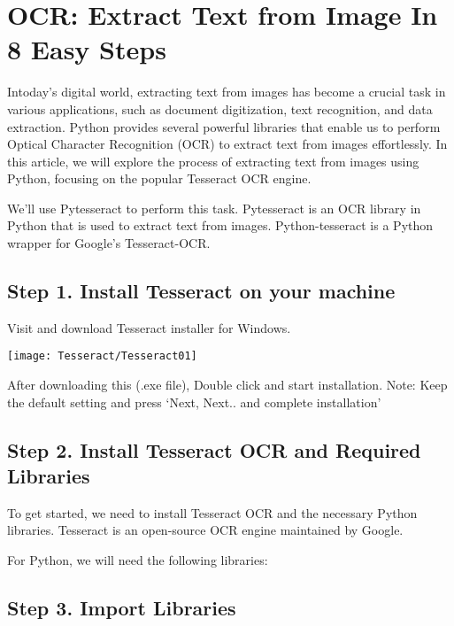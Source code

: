 
\chapter{OCR: Extract Text from Image In 8 Easy Steps}

Intoday’s digital world, extracting text from images has become a crucial task in various applications, such as document digitization, text recognition, and data extraction. Python provides several powerful libraries that enable us to perform Optical Character Recognition (OCR) to extract text from images effortlessly. In this article, we will explore the process of extracting text from images using Python, focusing on the popular Tesseract OCR engine.

We’ll use Pytesseract to perform this task.
Pytesseract is an OCR library in Python that is used to extract text from images. Python-tesseract is a Python wrapper for Google’s Tesseract-OCR.

\section{Step 1. Install Tesseract on your machine}

Visit  and download Tesseract installer for Windows.

\texttt{[image: Tesseract/Tesseract01]}

After downloading this (.exe file), Double click and start installation.
Note: Keep the default setting and press ‘Next, Next.. and complete installation’

\section{Step 2. Install Tesseract OCR and Required Libraries}

To get started, we need to install Tesseract OCR and the necessary Python libraries. Tesseract is an open-source OCR engine maintained by Google.

For Python, we will need the following libraries:



\section{Step 3. Import Libraries}

